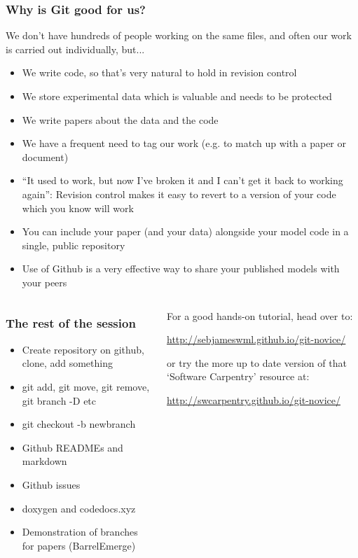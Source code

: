 \documentclass{beamer}
\begin{document}
\begin{frame}
  \frametitle{Why is Git good for us?}
  We don't have hundreds of people working on the same files, and
  often our work is carried out individually, but...
  \begin{itemize}
    \pause \item We write code, so that's very natural to hold in
    revision control
    \pause \item We store experimental data which is valuable and needs to be
    protected
    \pause \item We write papers about the data and the code
    \pause \item We have a frequent need to \alert{tag} our work (e.g. to
    match up with a paper or document)
    \pause \item ``It used to work, but now I've broken it and I can't
    get it back to working again'': Revision control makes it easy to
    revert to a version of your code which you know will work
    \pause \item You can include your paper (and your data) alongside your model code
    in a single, public repository
    \item Use of Github is a very effective way to share your
    published models with your peers
  \end{itemize}
\end{frame}

\begin{frame}
  \begin{columns}[T]
    \begin{column}{.5\textwidth}
      \frametitle{The rest of the session}
      \begin{itemize}
      \item Create repository on github, clone, add something
      \item git add, git move, git remove, git branch -D etc
      \item git checkout -b newbranch
      \item Github READMEs and markdown
      \item Github issues
      \item doxygen and codedocs.xyz
      \item Demonstration of branches for papers (BarrelEmerge)
      \end{itemize}
    \end{column}
    \begin{column}{.5\textwidth}

      For a good hands-on tutorial, head over to:

      \url{http://sebjameswml.github.io/git-novice/}

      or try the more up to date version of that `Software Carpentry' resource
      at:

      \url{http://swcarpentry.github.io/git-novice/}

    \end{column}
  \end{columns}
\end{frame}
\end{document}
